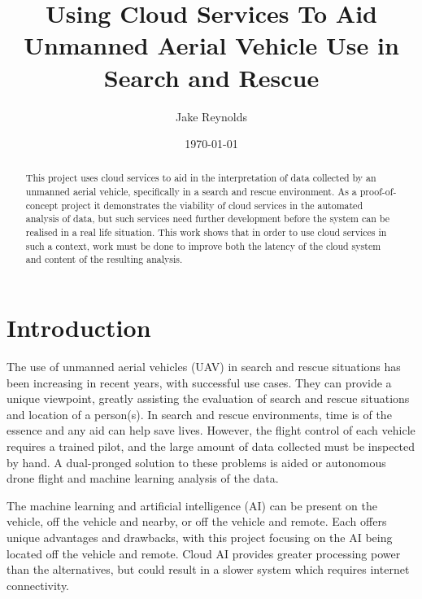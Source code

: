 \documentclass{article}
\begin{document}
\begin{titlingpage}

\title{Using Cloud Services To Aid Unmanned Aerial Vehicle Use in Search and Rescue}
\author{Jake Reynolds}
\date{\today}
\maketitle

\vspace*{\fill}

\begin{abstract}
\begin{large}
This project uses cloud services to aid in the interpretation of data collected by an unmanned aerial vehicle, specifically in a search and rescue environment. As a proof-of-concept project it demonstrates the viability of cloud services in the automated analysis of data, but such services need further development before the system can be realised in a real life situation. This work shows that in order to use cloud services in such a context, work must be done to improve both the latency of the cloud system and content of the resulting analysis.
\end{large}
\end{abstract}
\vspace*{\fill}
\end{titlingpage}

\tableofcontents


\section{Introduction}
The use of unmanned aerial vehicles (UAV) in search and rescue situations has been increasing in recent years, with successful use cases\cite{UAVUseCase}. They can provide a unique viewpoint, greatly assisting the evaluation of search and rescue situations and location of a person(s). In search and rescue environments, time is of the essence and any aid can help save lives. However, the flight control of each vehicle requires a trained pilot, and the large amount of data collected must be inspected by hand. A dual-pronged solution to these problems is aided or autonomous drone flight and machine learning analysis of the data.

The machine learning and artificial intelligence (AI) can be present on the vehicle, off the vehicle and nearby, or off the vehicle and remote. Each offers unique advantages and drawbacks, with this project focusing on the AI being located off the vehicle and remote. Cloud AI provides greater processing power than the alternatives, but could result in a slower system which requires internet connectivity. 
\end{document}
